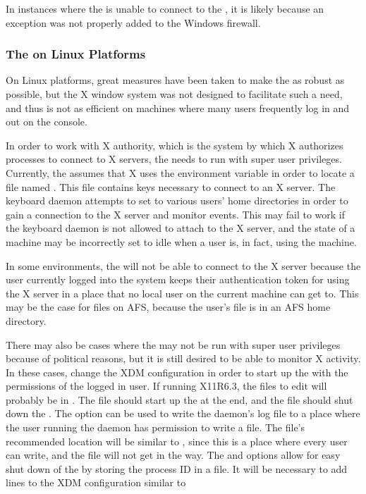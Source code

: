 In instances where the  is unable to connect to the
,
it is likely because an
exception was not properly added to the Windows firewall.

\subsubsection{\label{sec:kbdd-Linux}The  on Linux Platforms}

On Linux platforms, great measures have been taken to make 
the  as robust as possible, 
but the X window system was not designed to facilitate such a need,
and thus is not as efficient on machines where many users frequently log
in and out on the console.

In order to work with X authority, 
which is the system by which X authorizes processes to connect to X servers,
the  needs to run with super user privileges.
Currently, the  assumes that X
uses the  environment variable in order to locate a file
named . 
This file contains keys necessary to connect to an X server.
The keyboard daemon attempts to set 
to various users' home directories in order to gain a
connection to the X server and monitor events.
This may fail to work if the
keyboard daemon is not allowed to attach to the X server,
and the state of a machine may be incorrectly set to idle when a user is,
in fact,
using the machine.

In some environments, the   will not be able to connect to the X
server because the user currently logged into the system keeps their
authentication token for using the X server in a place that no local user on
the current machine can get to.  
This may be the case for files on AFS, 
because the user's  file is in an AFS home directory.

There may also
be cases where the  may not be run with super user privileges
because of political reasons,
but it is still desired to be able to monitor X activity.
In these cases, change the XDM configuration in order to
start up the  with the permissions of the logged in user.
If running X11R6.3, 
the files to edit will probably be in .
The 
file should start up the  at the end,
and the  file
should shut down the .  
The  option can be used to write the daemon's log file to a
place where the user running the daemon has permission to write a file.
The file's recommended location will be similar to
,
since this is a place where every
user can write, and the file will not get in the way.
The  and 
options allow
for easy shut down of the  by storing the process ID in a file.  
It will be necessary
to add lines to the XDM configuration similar to

